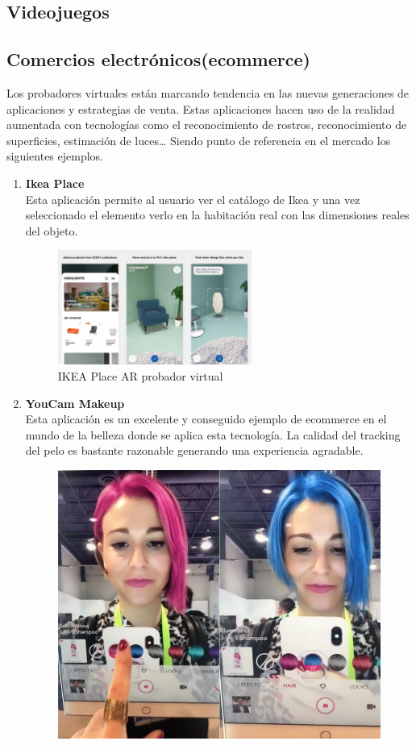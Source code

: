 \subsection{Videojuegos}


\subsection{Comercios electrónicos(ecommerce)}
Los probadores virtuales están marcando tendencia en las nuevas generaciones de aplicaciones y estrategias de venta. Estas aplicaciones hacen uso de la realidad aumentada con tecnologías como el reconocimiento de rostros, reconocimiento de superficies, estimación de luces… Siendo punto de referencia en el mercado los siguientes ejemplos. 
\begin{enumerate}
\item \textbf{Ikea Place}\\
Esta aplicación permite al usuario ver el catálogo de Ikea y una vez seleccionado el elemento verlo en la habitación real con las dimensiones reales del objeto.
\begin{figure}[H]
     \centering
     \includegraphics[width=0.6\textwidth]{Images/Ikea_App.jpeg}
     \caption{IKEA Place AR probador virtual}
     \label{fig:Ikea}
 \end{figure}
 \item
 \textbf{YouCam Makeup}\\
Esta aplicación es un excelente y conseguido ejemplo de ecommerce en el mundo de la belleza donde se aplica esta tecnología. La calidad del tracking del pelo es bastante razonable generando una experiencia agradable.
\begin{figure}[H]
    \centering
    \includegraphics{Images/Loreal_App.jpeg}

\end{figure}
\end{enumerate}
